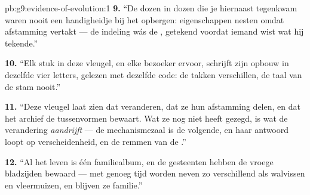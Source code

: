 \begin{solution}{pb:g9:evidence-of-evolution:1}
\textbf{9.} ``De dozen in dozen die je hiernaast tegenkwam waren
nooit een handigheidje bij het opbergen: eigenschappen nesten omdat
afstamming vertakt --- de indeling wás de , getekend voordat
iemand wist wat hij tekende.''

\textbf{10.} ``Elk stuk in deze vleugel, en elke bezoeker ervoor,
schrijft zijn opbouw in dezelfde vier letters, gelezen met dezelfde
code: de takken verschillen, de taal van de stam nooit.''

\textbf{11.} ``Deze vleugel laat zien dat  veranderen, dat
ze hun afstamming delen, en dat het archief de tussenvormen bewaart.
Wat ze nog niet heeft gezegd, is wat de verandering \emph{aandrijft}
--- de mechanismezaal is de volgende, en haar antwoord loopt op
verscheidenheid,  en de remmen van de .''

\textbf{12.} ``Al het leven is één familiealbum, en de gesteenten
hebben de vroege bladzijden bewaard --- met genoeg tijd worden neven
zo verschillend als walvissen en vleermuizen, en blijven ze
familie.''
\end{solution}
